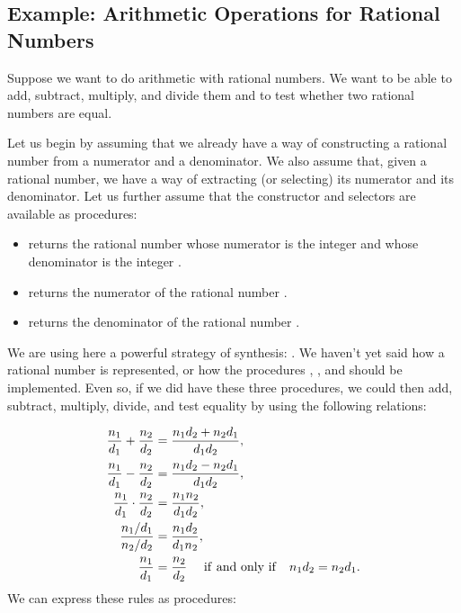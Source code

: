 \subsection{Example: Arithmetic Operations for Rational Numbers}
\label{Section 2.1.1}

Suppose we want to do arithmetic with rational numbers.  We want to be able to
add, subtract, multiply, and divide them and to test whether two rational
numbers are equal.

Let us begin by assuming that we already have a way of constructing a rational
number from a numerator and a denominator.  We also assume that, given a
rational number, we have a way of extracting (or selecting) its numerator and
its denominator.  Let us further assume that the constructor and selectors are
available as procedures:

\begin{itemize}
\item
{}\code{, }\code{)}
returns the rational number whose numerator is the integer
 and whose denominator is the integer .

\item
{}\code{)} returns the numerator of the rational number
.

\item
{}\code{)} returns the denominator of the rational number
.
\end{itemize}

\noindent
We are using here a powerful strategy of synthesis: .
We haven't yet said how a rational number is represented, or how the procedures
, , and  should be implemented.  Even
so, if we did have these three procedures, we could then add, subtract,
multiply, divide, and test equality by using the following relations:

\begin{align*}
  \frac{n_1}{d_1} + \frac{n_2}{d_2} 	&= \frac{n_1 d_2 + n_2 d_1}{d_1 d_2}, \\
  \frac{n_1}{d_1} - \frac{n_2}{d_2} 	&= \frac{n_1 d_2 - n_2 d_1}{d_1 d_2}, \\
  \frac{n_1}{d_1} \cdot \frac{n_2}{d_2}	&= \frac{n_1 n_2}{d_1 d_2}, \\
  \frac{{n_1 / d_1}}{{n_2 / d_2}} 	&= \frac{n_1 d_2}{d_1 n_2}, \\
  \frac{n_1}{d_1} 			&= \frac{n_2}{d_2} \quad
						{\rm\ if\ and\ only\ if\quad}
						n_1 d_2 = n_2 d_1.
\end{align*}
\noindent
We can express these rules as procedures:

